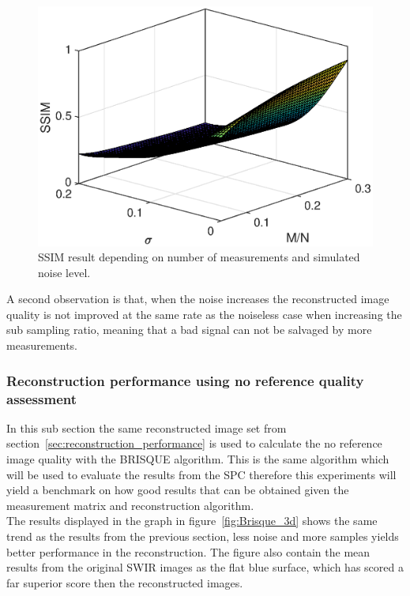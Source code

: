 \begin{figure}[H]
    \centering
    \includegraphics[width = 0.7\linewidth]{result/synt_sss/SSIM_fit.eps}
    \caption{SSIM result depending on number of measurements and simulated noise level.}
    \label{fig:ssim_3d}
\end{figure}

A second observation is that, when the noise increases the  reconstructed image quality is not improved at the same rate as the noiseless case when increasing the sub sampling ratio, meaning that a bad signal can not be salvaged by more measurements.  

\subsubsection{Reconstruction performance using no reference quality assessment}
In this sub section the same reconstructed image set from section~\ref{sec:reconstruction_performance} is used to calculate the no reference image quality with the BRISQUE algorithm. This is the same algorithm which will be used to evaluate the results from the SPC therefore this experiments will yield a benchmark on how good results that can be obtained given the measurement matrix and reconstruction algorithm.\\[0.1in] 

The results displayed in the graph in figure~\ref{fig:Brisque_3d} shows the same trend as the results from the previous section, less noise and more samples yields better performance in the reconstruction. The figure also contain the mean results from the original SWIR images as the flat blue surface, which has scored a far superior score then the reconstructed images.  
  

